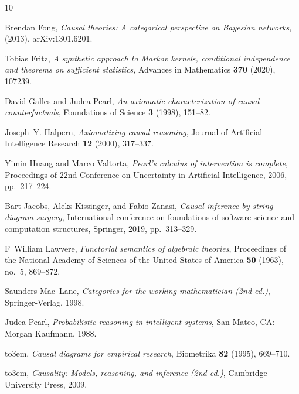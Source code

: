 \documentclass[12pt]{amsart}
\theoremstyle{plain}
\theoremstyle{definition}
\theoremstyle{remark}
\numberwithin{equation}{section}
\theoremstyle{plain}
\newcommand{\0}{\emptyset}
\begin{document}
\providecommand{\bysame}{\leavevmode\hbox to3em{\hrulefill}\thinspace}
\providecommand{\MR}{\relax\ifhmode\unskip\space\fi MR }
\providecommand{\MRhref}[2]{%
  \href{http://www.ams.org/mathscinet-getitem?mr=#1}{#2}
}
\providecommand{\href}[2]{#2}
\begin{thebibliography}{10}

Brendan Fong, \emph{Causal theories: {A} categorical perspective on {B}ayesian
  networks},  (2013), arXiv:1301.6201.

Tobias Fritz, \emph{A synthetic approach to {M}arkov kernels, conditional
  independence and theorems on sufficient statistics}, Advances in Mathematics
  \textbf{370} (2020), 107239.

David Galles and Judea Pearl, \emph{An axiomatic characterization of causal
  counterfactuals}, Foundations of Science \textbf{3} (1998), 151--82.

Joseph~Y. Halpern, \emph{Axiomatizing causal reasoning}, Journal of Artificial
  Intelligence Research \textbf{12} (2000), 317--337.

Yimin Huang and Marco Valtorta, \emph{Pearl's calculus of intervention is
  complete}, Proceedings of 22nd Conference on Uncertainty in Artificial
  Intelligence, 2006, pp.~217--224.

Bart Jacobs, Aleks Kissinger, and Fabio Zanasi, \emph{Causal inference by
  string diagram surgery}, International conference on foundations of software
  science and computation structures, Springer, 2019, pp.~313--329.

F~William Lawvere, \emph{Functorial semantics of algebraic theories},
  Proceedings of the National Academy of Sciences of the United States of
  America \textbf{50} (1963), no.~5, 869--872.

Saunders Mac~Lane, \emph{Categories for the working mathematician (2nd ed.)},
  Springer-Verlag, 1998.

Judea Pearl, \emph{Probabilistic reasoning in intelligent systems}, San Mateo,
  CA: Morgan Kaufmann, 1988.

\bysame, \emph{Causal diagrams for empirical research}, Biometrika \textbf{82}
  (1995), 669--710.

\bysame, \emph{Causality: Models, reasoning, and inference (2nd ed.)},
  Cambridge University Press, 2009.


\end{thebibliography}
\end{document}
